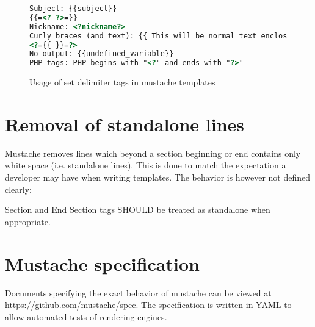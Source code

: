 \documentclass[thesis.tex]{subfiles}
\begin{document}
\begin{figure}
	\centering
	\begin{lstlisting}[language=HTML]
Subject: {{subject}}
{{=<? ?>=}}
Nickname: <?nickname?>
Curly braces (and text): {{ This will be normal text enclosed by curly braces }}
<?={{ }}=?>
No output: {{undefined_variable}}
PHP tags: PHP begins with "<?" and ends with "?>"
	\end{lstlisting}
	\caption{Usage of set delimiter tags in mustache templates}
	\label{fig:set-delim.mustache}
\end{figure}

\section{Removal of standalone lines}
\label{sec:standalone-lines}
Mustache removes lines which beyond a section beginning or end contains
only white space (i.e. standalone lines).
This is done to match the expectation a developer may have when writing
templates.
The behavior is however not defined clearly:
\begin{citequote}{\cite[sections.yml]{MSTSPEC}}
	Section and End Section tags SHOULD be treated as standalone when
	appropriate. 
\end{citequote}

\section{Mustache specification}
Documents specifying the exact behavior of mustache can be viewed at
\url{https://github.com/mustache/spec}. The specification is written in YAML to
allow automated tests of rendering engines.
\end{document}
